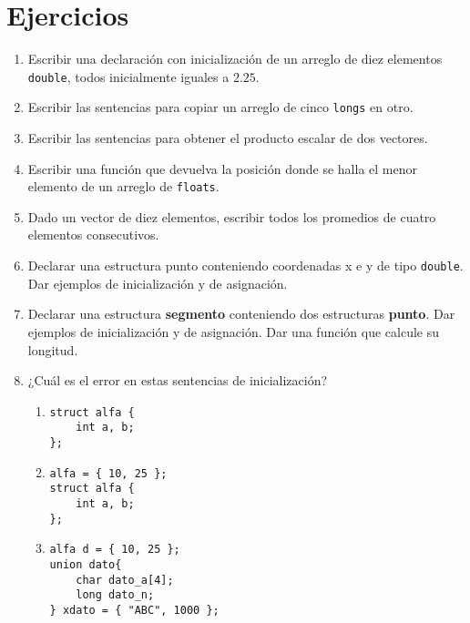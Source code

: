 \section{Ejercicios}
\begin{enumerate}
\item Escribir una declaración con inicialización de un arreglo de diez elementos
\lstinline{double}, todos inicialmente iguales a $2.25$.
\item Escribir las sentencias para copiar un arreglo de cinco \lstinline{longs} en otro.
\item Escribir las sentencias para obtener el producto escalar de dos vectores.
\item Escribir una función que devuelva la posición donde se halla el menor
elemento de un arreglo de \lstinline{floats}.
\item Dado un vector de diez elementos, escribir todos los promedios de cuatro
elementos consecutivos.
\item Declarar una estructura punto conteniendo coordenadas x e y de tipo \lstinline{double}.
Dar ejemplos de inicialización y de asignación.
\item Declarar una estructura \textbf{segmento} conteniendo dos estructuras \textbf{punto}. Dar
ejemplos de inicialización y de asignación. Dar una función que calcule su
longitud.
\item ¿Cuál es el error en estas sentencias de inicialización?
\begin{enumerate} [label=\alph*.]

\item 
\begin{lstlisting}
struct alfa {
	int a, b;
};
\end{lstlisting}

\item 
\begin{lstlisting}
alfa = { 10, 25 };
struct alfa {
	int a, b;
};
\end{lstlisting}

\item 
\begin{lstlisting}
alfa d = { 10, 25 };
union dato{
	char dato_a[4];
	long dato_n;
} xdato = { "ABC", 1000 };
\end{lstlisting}
\end{enumerate}
\end{enumerate}


